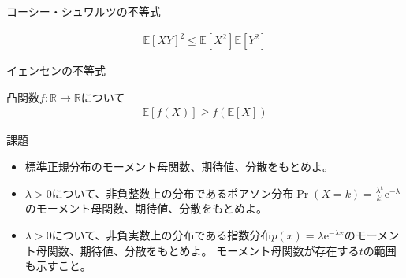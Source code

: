 \documentclass[lualatex,handout]{beamer}
\newcommand{\expt}[1]{\mathbb{E}\left[#1\right]}
\theoremstyle{definition}
\begin{document}
\begin{frame}{コーシー・シュワルツの不等式}
\begin{theorem}
\begin{align*}
\expt{XY}^2 \le \expt{X^2}\expt{Y^2}
\end{align*}
\end{theorem}
\end{frame}

\begin{frame}{イェンセンの不等式}
\begin{theorem}
凸関数$f\colon\mathbb{R}\to\mathbb{R}$について
\begin{align*}
\expt{f(X)} \ge f(\expt{X})
\end{align*}
\end{theorem}

\end{frame}
\fi

\begin{frame}{課題}
\begin{itemize}
\setlength{\itemsep}{2em}
\item 標準正規分布のモーメント母関数、期待値、分散をもとめよ。
\item $\lambda>0$について、非負整数上の分布であるポアソン分布$\Pr(X=k)=\frac{\lambda^k}{k!}\mathrm{e}^{-\lambda}$のモーメント母関数、期待値、分散をもとめよ。
\item $\lambda>0$について、非負実数上の分布である指数分布$p(x)=\lambda\mathrm{e}^{-\lambda x}$のモーメント母関数、期待値、分散をもとめよ。
モーメント母関数が存在する$t$の範囲も示すこと。
\end{itemize}
\end{frame}
\end{document}
